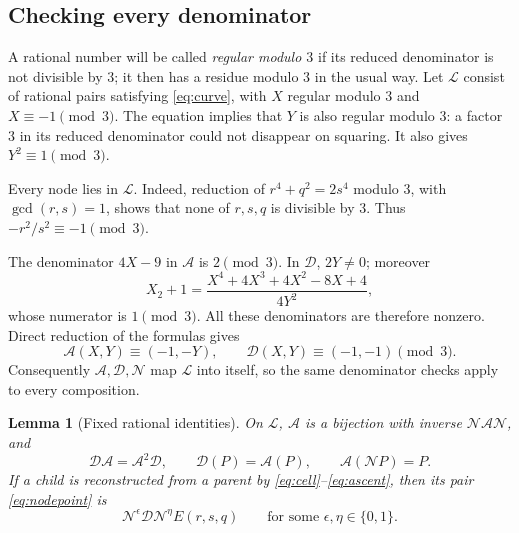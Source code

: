 \documentclass[11pt,a4paper]{article}
\newtheorem{lemma}[theorem]{Lemma}
\theoremstyle{definition}
\newcommand{\NN}{\mathcal N}
\renewcommand{\AA}{\mathcal A}
\newcommand{\DD}{\mathcal D}
\begin{document}
\subsection{Checking every denominator}

A rational number will be called \emph{regular modulo \(3\)} if its
reduced denominator is not divisible by \(3\); it then has a residue
modulo \(3\) in the usual way. Let \(\mathcal L\) consist of rational
pairs satisfying \eqref{eq:curve}, with \(X\) regular modulo \(3\)
and \(X\equiv-1\pmod3\). The equation implies that \(Y\) is also
regular modulo \(3\): a factor \(3\) in its reduced denominator
could not disappear on squaring. It also gives \(Y^2\equiv1\pmod3\).

Every node lies in \(\mathcal L\). Indeed, reduction of
\(r^4+q^2=2s^4\) modulo \(3\), with \(\gcd(r,s)=1\), shows that
none of \(r,s,q\) is divisible by \(3\). Thus
\(-r^2/s^2\equiv-1\pmod3\).

The denominator \(4X-9\) in \(\AA\) is \(2\pmod3\).
In \(\DD\), \(2Y\ne0\); moreover
\begin{equation}\label{eq:double-denom}
 X_2+1=\frac{X^4+4X^3+4X^2-8X+4}{4Y^2},
\end{equation}
whose numerator is \(1\pmod3\). All these denominators are therefore
nonzero. Direct reduction of the formulas gives
\[
 \AA(X,Y)\equiv(-1,-Y),\qquad
 \DD(X,Y)\equiv(-1,-1)\pmod3.
\]
Consequently \(\AA,\DD,\NN\) map \(\mathcal L\) into itself,
so the same denominator checks apply to every composition.

\begin{lemma}[Fixed rational identities]\label{lem:maps}
On \(\mathcal L\), \(\AA\) is a bijection with inverse
\(\NN\AA\NN\), and
\begin{equation}\label{eq:maplaws}
 \DD\AA=\AA^2\DD,\qquad \DD(P)=\AA(P),\qquad \AA(\NN P)=P.
\end{equation}
If a child is reconstructed from a parent by
\eqref{eq:cell}--\eqref{eq:ascent}, then its pair
\eqref{eq:nodepoint} is
\begin{equation}\label{eq:childD}
 \NN^{\epsilon}\DD\NN^{\eta}E(r,s,q)
 \qquad\text{for some }\epsilon,\eta\in\{0,1\}.
\end{equation}
\end{lemma}
\end{document}
